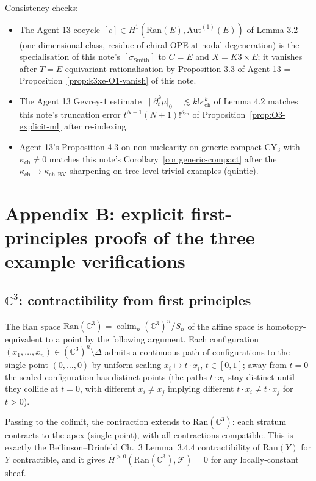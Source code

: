 \documentclass[11pt]{amsart}
\newcommand{\kch}{\kappa_{\mathrm{ch}}}
\newcommand{\kchBV}{\kappa_{\mathrm{ch},\mathrm{BV}}}
\newcommand{\cF}{\mathcal{F}}
\newcommand{\Ran}{\mathrm{Ran}}
\newcommand{\bC}{\mathbb{C}}
\DeclareMathOperator{\colim}{colim}
\begin{document}
Consistency checks:
\begin{itemize}[leftmargin=2em]
\item The Agent 13 cocycle $[c] \in H^1(\Ran(E), \mathrm{Aut}^{(1)}(E))$
of Lemma 3.2 (one-dimensional class, residue of chiral OPE at nodal
degeneration) is the specialisation of this note's
$[\sigma_{\mathrm{Smith}}]$ to $C = E$ and $X = K3 \times E$; it
vanishes after $T = E$-equivariant rationalisation by
Proposition 3.3 of Agent 13 = Proposition~\ref{prop:k3xe-O1-vanish}
of this note.
\item The Agent 13 Gevrey-$1$ estimate
$\|\partial_t^k \mu|_0\| \lesssim k! \kch^k$ of Lemma 4.2 matches this
note's truncation error $t^{N+1} (N+1)!^{\kch}$ of
Proposition~\ref{prop:O3-explicit-ml} after re-indexing.
\item Agent 13's Proposition 4.3 on non-nuclearity on generic
compact CY$_3$ with $\kch \neq 0$ matches this note's
Corollary~\ref{cor:generic-compact} after the
$\kch \to \kchBV$ sharpening on tree-level-trivial examples (quintic).
\end{itemize}

\section{Appendix B: explicit first-principles proofs of the three
example verifications}
\label{sec:appendix-B-first-principles}

\subsection{$\bC^3$: contractibility from first principles}

The Ran space $\Ran(\bC^3) = \colim_n (\bC^3)^n/S_n$ of the affine
space is homotopy-equivalent to a point by the following argument.
Each configuration $(x_1, \dots, x_n) \in (\bC^3)^n \setminus \Delta$
admits a continuous path of configurations to the single point
$(0, \dots, 0)$ by uniform scaling $x_i \mapsto t \cdot x_i$,
$t \in [0, 1]$; away from $t = 0$ the scaled configuration has
distinct points (the paths $t \cdot x_i$ stay distinct until they
collide at $t = 0$, with different $x_i \neq x_j$ implying different
$t \cdot x_i \neq t \cdot x_j$ for $t > 0$).

Passing to the colimit, the contraction extends to $\Ran(\bC^3)$:
each stratum contracts to the apex (single point), with all
contractions compatible. This is exactly the Beilinson--Drinfeld
Ch.~$3$ Lemma~$3.4.4$ contractibility of $\Ran(Y)$ for $Y$
contractible, and it gives $H^{> 0}(\Ran(\bC^3), \cF) = 0$ for any
locally-constant sheaf.
\end{document}
